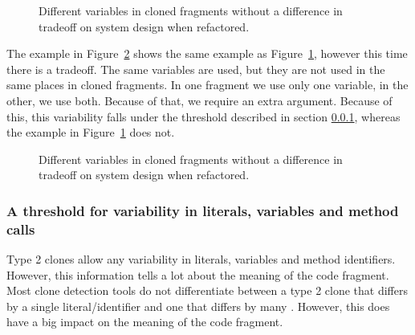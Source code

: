 \begin{figure}[H]
\begin{parcolumns}{2}
\end{parcolumns}
\caption{Different variables in cloned fragments without a difference in tradeoff on system design when refactored.}
\label{fig:type2variablerefactoringnotradeoff}
\end{figure}

The example in Figure~\ref{fig:type2variablerefactoringwithtradeoff} shows the same example as Figure~\ref{fig:type2variablerefactoringnotradeoff}, however this time there is a tradeoff. The same variables are used, but they are not used in the same places in cloned fragments. In one fragment we use only one variable, in the other, we use both. Because of that, we require an extra argument. Because of this, this variability falls under the threshold described in section \ref{sec:variabilitythreshold}, whereas the example in Figure~\ref{fig:type2variablerefactoringnotradeoff} does not.

\begin{figure}[H]
\begin{parcolumns}{2}
\end{parcolumns}
\caption{Different variables in cloned fragments without a difference in tradeoff on system design when refactored.}
\label{fig:type2variablerefactoringwithtradeoff}
\end{figure}

\subsubsection{A threshold for variability in literals, variables and method calls}\label{sec:variabilitythreshold}
Type 2 clones allow any variability in literals, variables and method identifiers. However, this information tells a lot about the meaning of the code fragment. Most clone detection tools do not differentiate between a type 2 clone that differs by a single literal/identifier and one that differs by many \cite{roy2009comparison}. However, this does have a big impact on the meaning of the code fragment.

